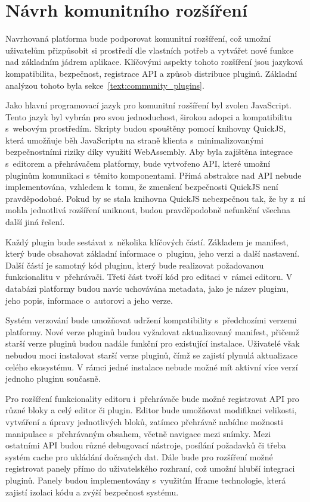 \section{Návrh komunitního rozšíření}\label{text:navrh/plugins}

Navrhovaná platforma bude podporovat komunitní rozšíření, což umožní uživatelům přizpůsobit si prostředí dle vlastních potřeb a vytvářet nové funkce nad základním jádrem aplikace.
Klíčovými aspekty tohoto rozšíření jsou jazyková kompatibilita, bezpečnost, registrace API a způsob distribuce pluginů.
Základní analýzou tohoto byla sekce~\ref{text:community_plugins}.

Jako hlavní programovací jazyk pro komunitní rozšíření byl zvolen JavaScript.
Tento jazyk byl vybrán pro svou jednoduchost, širokou adopci a kompatibilitu s~webovým prostředím.
Skripty budou spouštěny pomocí knihovny QuickJS, která umožňuje běh JavaScriptu na straně klienta s~minimalizovanými bezpečnostními riziky díky využití WebAssembly.
Aby byla zajištěna integrace s~editorem a přehrávačem platformy, bude vytvořeno API, které umožní pluginům komunikaci s~těmito komponentami. 
Přímá abstrakce nad API nebude implementována, vzhledem k~tomu, že zmenšení bezpečnosti QuickJS není pravděpodobné.
Pokud by se stala knihovna QuickJS nebezpečnou tak, že by z~ní mohla jednotlivá rozšíření uniknout, budou pravděpodobně nefunkční všechna další jiná řešení.

Každý plugin bude sestávat z~několika klíčových částí. 
Základem je manifest, který bude obsahovat základní informace o~pluginu, jeho verzi a další nastavení. 
Další částí je samotný kód pluginu, který bude realizovat požadovanou funkcionalitu v~přehrávači. 
Třetí část tvoří kód pro editaci v~rámci editoru. 
V databázi platformy budou navíc uchovávána metadata, jako je název pluginu, jeho popis, informace o~autorovi a jeho verze.

Systém verzování bude umožňovat udržení kompatibility s~předchozími verzemi platformy. 
Nové verze pluginů budou vyžadovat aktualizovaný manifest, přičemž starší verze pluginů budou nadále funkční pro existující instalace. 
Uživatelé však nebudou moci instalovat starší verze pluginů, čímž se zajistí plynulá aktualizace celého ekosystému.
V rámci jedné instalace nebude možné mít aktivní více verzí jednoho pluginu současně.

Pro rozšíření funkcionality editoru i~přehrávače bude možné registrovat API pro různé bloky a celý editor či plugin.
Editor bude umožňovat modifikaci velikosti, vytváření a úpravy jednotlivých bloků, zatímco přehrávač nabídne možnosti manipulace s~přehrávaným obsahem, včetně navigace mezi snímky.
Mezi ostatními API budou různé debugovací nástroje, posílání požadavků či třeba systém cache pro ukládání dočasných dat.
Dále bude pro rozšíření možné registrovat panely přímo do uživatelského rozhraní, což umožní hlubší integraci pluginů.
Panely budou implementovány s~využitím Iframe technologie, která zajistí izolaci kódu a zvýší bezpečnost systému.

